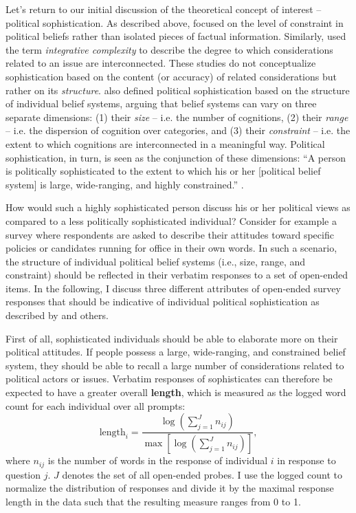 \documentclass[12pt]{article}
\begin{document}
Let's return to our initial discussion of the theoretical concept of interest -- political sophistication. As described above, \citet{converse1964nature} focused on the level of constraint in political beliefs rather than isolated pieces of factual information. Similarly, \citet{tetlock1983cognitive} used the term \textsl{integrative complexity} to describe the degree to which considerations related to an issue are interconnected. These studies do not conceptualize sophistication based on the content (or accuracy) of related considerations but rather on its \textsl{structure}. \citet{luskin1987measuring} also defined political sophistication based on the structure of individual belief systems, arguing that belief systems can vary on three separate dimensions: (1) their \textsl{size} -- i.e. the number of cognitions, (2) their \textsl{range} -- i.e. the dispersion of cognition over categories, and (3) their \textsl{constraint} -- i.e. the extent to which cognitions are interconnected in a meaningful way. Political sophistication, in turn, is seen as the conjunction of these dimensions: ``A person is politically sophisticated to the extent to which his or her [political belief system] is large, wide-ranging, and highly constrained.'' \citep[860]{luskin1987measuring}.

How would such a highly sophisticated person discuss his or her political views as compared to a less politically sophisticated individual? Consider for example a survey where respondents are asked to describe their attitudes toward specific policies or candidates running for office in their own words. In such a scenario, the structure of individual political belief systems (i.e., size, range, and constraint) should be reflected in their verbatim responses to a set of open-ended items. In the following, I discuss three different attributes of open-ended survey responses that should be indicative of individual political sophistication as described by \citet{luskin1987measuring} and others.

First of all, sophisticated individuals should be able to elaborate more on their political attitudes. If people possess a large, wide-ranging, and constrained belief system, they should be able to recall a large number of considerations related to political actors or issues. Verbatim responses of sophisticates can therefore be expected to have a greater overall \textbf{length}, which is measured as the logged word count for each individual over all prompts:
\begin{equation}
\text{length}_i = \dfrac{\log\left(\sum_{j=1}^J n_{ij}\right)}{\max\left[\log\left(\sum_{j=1}^J n_{ij}\right)\right]},
\end{equation}
where $n_{ij}$ is the number of words in the response of individual $i$ in response to question $j$. $J$ denotes the set of all open-ended probes. I use the logged count to normalize the distribution of responses and divide it by the maximal response length in the data such that the resulting measure ranges from 0 to 1.
\end{document}
